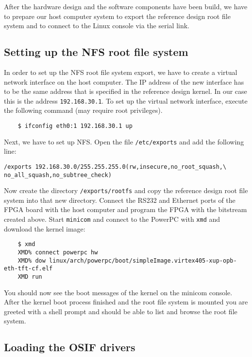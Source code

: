 \documentclass[DIV15,a4paper]{scrartcl}
\begin{document}
After the hardware design and the software components have been build, we have to prepare our host computer system to export the reference design root file system and
to connect to the Linux console via the serial link.

\subsection*{Setting up the NFS root file system}

In order to set up the NFS root file system export, we have to create a virtual network interface on the host computer. The IP address of the new interface has to be the same
address that is specified in the reference design kernel. In our case this is the address  \texttt{192.168.30.1}. To set up the virtual network interface, execute the following
command (may require root privileges).

\begin{verbatim}
	$ ifconfig eth0:1 192.168.30.1 up
\end{verbatim}

Next, we have to set up NFS. Open the file \texttt{/etc/exports} and add the following line:

\begin{verbatim}
/exports 192.168.30.0/255.255.255.0(rw,insecure,no_root_squash,\
no_all_squash,no_subtree_check)
\end{verbatim}

Now create the directory \texttt{/exports/rootfs} and copy the reference design root file system into that new directory. Connect the RS232 and Ethernet ports of the FPGA board
with the host computer and program the FPGA with the bitstream created above. Start \texttt{minicom} and connect to the PowerPC with \texttt{xmd} and download the kernel image:

\begin{verbatim}
	$ xmd
	XMD% connect powerpc hw
	XMD% dow linux/arch/powerpc/boot/simpleImage.virtex405-xup-opb-eth-tft-cf.elf
	XMD run
\end{verbatim}

You should now see the boot messages of the kernel on the minicom console. After the kernel boot process finished and the root file system is mounted you are greeted with a shell
prompt and should be able to list and browse the root file system.

\subsection*{Loading the OSIF drivers}
\end{document}

